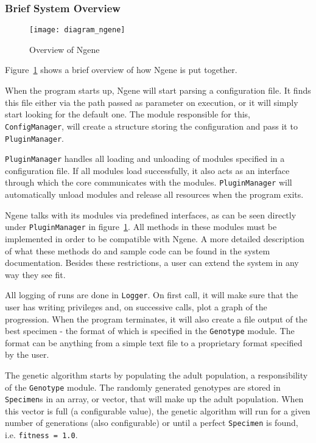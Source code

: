 \subsubsection{Brief System Overview}
\begin{figure}[!ht]
	\centering
	\texttt{[image: diagram\_ngene]}
	\caption{Overview of Ngene}
	\label{fig:diagram_ngene}
\end{figure}

Figure~\ref{fig:diagram_ngene} shows a brief overview of how Ngene is put together.

When the program starts up, Ngene will start parsing a configuration file. It finds this file either via the path passed as parameter on execution, or it will simply start looking for the default one. The module responsible for this, \texttt{ConfigManager}, will create a structure storing the configuration and pass it to \texttt{PluginManager}.

\texttt{PluginManager} handles all loading and unloading of modules specified in a configuration file. If all modules load successfully, it also acts as an interface through which the core communicates with the modules. \texttt{PluginManager} will automatically unload modules and release all resources when the program exits.

Ngene talks with its modules via predefined interfaces, as can be seen directly under \texttt{PluginManager} in figure~\ref{fig:diagram_ngene}. All methods in these modules must be implemented in order to be compatible with Ngene. A more detailed description of what these methods do and sample code can be found in the system documentation. Besides these restrictions, a user can extend the system in any way they see fit.

All logging of runs are done in \texttt{Logger}. On first call, it will make sure that the user has writing privileges and, on successive calls, plot a graph of the progression. When the program terminates, it will also create a file output of the best specimen - the format of which is specified in the \texttt{Genotype} module. The format can be anything from a simple text file to a proprietary format specified by the user.

The genetic algorithm starts by populating the adult population, a responsibility of the \texttt{Genotype} module. The randomly generated genotypes are stored in \texttt{Specimen}s in an array, or vector, that will make up the adult population. When this vector is full (a configurable value), the genetic algorithm will run for a given number of generations (also configurable) or until a perfect \texttt{Specimen} is found, i.e. \texttt{fitness = 1.0}.


